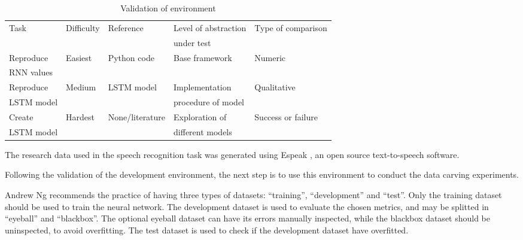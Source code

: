 \begin{table*}[!ht]
    \centering
    \caption{Validation of environment}
    \label{tab:validation}
    \begin{tabular}{ l | l | l | l | l }
Task                 & Difficulty & Reference       & Level of abstraction              & Type of comparison \\
                     &            &                 &                      under test   &                    \\ 
\hline
Reproduce            & Easiest   & Python code     & Base framework                    & Numeric            \\
          RNN values &            &                 &                                   &                    \\
\hline
Reproduce            & Medium     & LSTM model      & Implementation                    & Qualitative        \\
          LSTM model &            &                 &                procedure of model &                    \\
\hline
Create               & Hardest    & None/literature & Exploration of                    & Success or failure \\
       LSTM model    &            &                 &                different models   &                    \\
\hline
    \end{tabular}
\end{table*}


The research data used in the speech recognition task was generated using Espeak , an open source text-to-speech software. 

Following the validation of the development environment, the next step is to use this environment to conduct the data carving experiments.

Andrew Ng recommends the practice of having three types of datasets: ``training'', ``development'' and ``test''. Only the training dataset should be used to train the neural network. The development dataset is used to evaluate the chosen metrics, and may be splitted in ``eyeball'' and ``blackbox''. The optional eyeball dataset can have its errors manually inspected, while the blackbox dataset should be uninspected, to avoid overfitting. The test dataset is used to check if the development dataset have overfitted.

